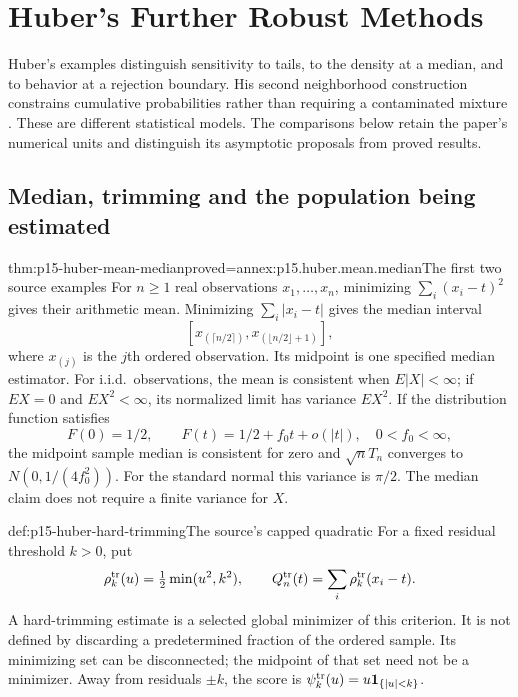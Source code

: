 \chapter{Huber's Further Robust Methods}
\label{sec:p15-huber-remaining-methods}

Huber's examples distinguish sensitivity to tails, to the density
at a median, and to behavior at a rejection boundary. His second
neighborhood construction constrains cumulative probabilities rather
than requiring a contaminated mixture
\cite[Secs.~4, 7 and 9]{Huber1964RobustLocation}.
These are different statistical models. The comparisons below retain
the paper's numerical units and distinguish its asymptotic proposals
from proved results.

\section{Median, trimming and the population being estimated}
\label{sec:p15-huber-median-trimming}

\begin{hbtheorem}{thm:p15-huber-mean-median}{proved=annex:p15.huber.mean.median}{The first two source examples}
For \(n\geq1\) real observations \(x_1,\ldots,x_n\), minimizing
\(\sum_i(x_i-t)^2\) gives their arithmetic mean.
Minimizing \(\sum_i|x_i-t|\) gives the median interval
\[
 [x_{(\lceil n/2\rceil)},x_{(\lfloor n/2\rfloor+1)}],
\]
where \(x_{(j)}\) is the \(j\)th ordered observation.
Its midpoint is one specified median estimator.
For i.i.d.\ observations, the mean is consistent when \(E|X|<\infty\);
if \(EX=0\) and \(EX^2<\infty\), its normalized limit has variance
\(EX^2\). If the distribution function satisfies
\[
 F(0)=1/2,\qquad F(t)=1/2+f_0t+o(|t|),\quad 0<f_0<\infty,
\]
the midpoint sample median is consistent for zero and
\(\sqrt n T_n\) converges to \(N(0,1/(4f_0^2))\).
For the standard normal this variance is \(\pi/2\).
The median claim does not require a finite variance for \(X\).
\end{hbtheorem}

\begin{hbdefinition}{def:p15-huber-hard-trimming}{The source's capped quadratic}
For a fixed residual threshold \(k>0\), put
\[
 \rho^{\rm tr}_k(u)=\tfrac12\min(u^2,k^2),\qquad
 Q^{\rm tr}_n(t)=\sum_i\rho^{\rm tr}_k(x_i-t).
\]
A hard-trimming estimate is a selected global minimizer of this
criterion. It is not defined by discarding a predetermined fraction
of the ordered sample. Its minimizing set can be disconnected;
the midpoint of that set need not be a minimizer.
Away from residuals \(\pm k\), the score is
\(\psi^{\rm tr}_k(u)=u{\bf1}_{\{|u|<k\}}\).
\end{hbdefinition}

